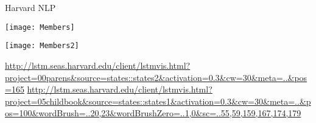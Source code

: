 

\begin{frame}{Harvard NLP}
  \begin{center}
  \texttt{[image: Members]}

  \texttt{[image: Members2]}
  \end{center}
\end{frame}



\begin{frame}
  \url{http://lstm.seas.harvard.edu/client/lstmvis.html?project=00parens&source=states::states2&activation=0.3&cw=30&meta=..&pos=165}
  \url{http://lstm.seas.harvard.edu/client/lstmvis.html?project=05childbook&source=states::states1&activation=0.3&cw=30&meta=..&pos=100&wordBrush=..20,23&wordBrushZero=..1,0&sc=..55,59,159,167,174,179}

\end{frame}